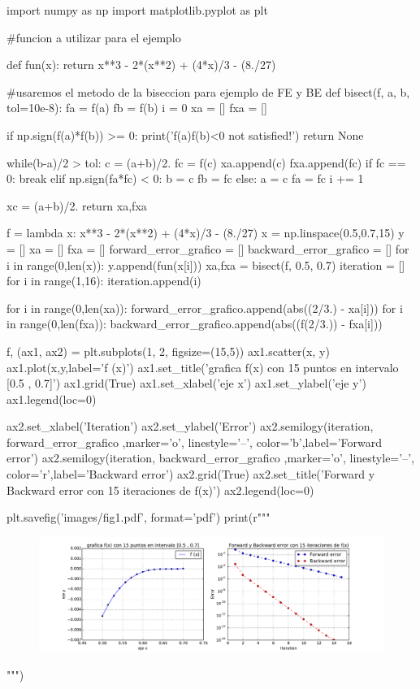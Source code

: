 \begin{python}
import numpy as np
import matplotlib.pyplot as plt

#funcion a utilizar para el ejemplo

def fun(x):
    return x**3 - 2*(x**2) + (4*x)/3 - (8./27)

#usaremos el metodo de la biseccion para ejemplo de FE y BE
def bisect(f, a, b, tol=10e-8):
    fa = f(a)
    fb = f(b)
    i = 0
    xa = []
    fxa = []
    
    if np.sign(f(a)*f(b)) >= 0:
        print('f(a)f(b)<0 not satisfied!')
        return None
    
    while(b-a)/2 > tol:
        c = (a+b)/2.
        fc = f(c)
        xa.append(c)
        fxa.append(fc)
        if fc == 0:
            break
        elif np.sign(fa*fc) < 0:
            b = c
            fb = fc
        else:
            a = c
            fa = fc
        i += 1
        
    xc = (a+b)/2.
    return xa,fxa

f = lambda x: x**3 - 2*(x**2) + (4*x)/3 - (8./27)
x = np.linspace(0.5,0.7,15)
y = []
xa = []
fxa = []
forward_error_grafico = []
backward_error_grafico = []
for i in range(0,len(x)):
    y.append(fun(x[i]))
xa,fxa = bisect(f, 0.5, 0.7)
iteration = []
for i in range(1,16):
    iteration.append(i)

for i in range(0,len(xa)):
    forward_error_grafico.append(abs((2/3.) - xa[i]))
for i in range(0,len(fxa)):
    backward_error_grafico.append(abs((f(2/3.)) - fxa[i]))

f, (ax1, ax2) = plt.subplots(1, 2, figsize=(15,5)) 
ax1.scatter(x, y)
ax1.plot(x,y,label='f (x)')
ax1.set_title('grafica f(x) con 15 puntos en intervalo [0.5 , 0.7]')
ax1.grid(True)
ax1.set_xlabel('eje x')
ax1.set_ylabel('eje y')
ax1.legend(loc=0)

ax2.set_xlabel('Iteration')
ax2.set_ylabel('Error')
ax2.semilogy(iteration, forward_error_grafico ,marker='o', linestyle='--', color='b',label='Forward error')
ax2.semilogy(iteration, backward_error_grafico ,marker='o', linestyle='--', color='r',label='Backward error')
ax2.grid(True)
ax2.set_title('Forward y Backward error con 15 iteraciones de f(x)')
ax2.legend(loc=0)

plt.savefig('images/fig1.pdf', format='pdf')
print(r"""
\begin{figure}[htbp]
    \centering
    \includegraphics[width=18cm]{images/fig1.pdf}
    \label{fig:comparison}
\end{figure}
""")
\end{python}

